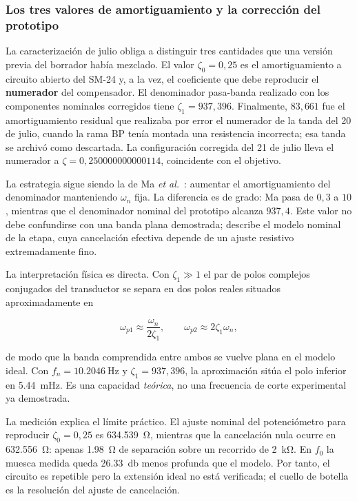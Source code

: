 \subsubsection{Los tres valores de amortiguamiento y la correcci\'on del prototipo}

La caracterizaci\'on de julio obliga a distinguir tres cantidades que una versi\'on previa
del borrador hab\'ia mezclado. El valor $\zeta_0=0{,}25$ es el amortiguamiento a circuito
abierto del SM-24 y, a la vez, el coeficiente que debe reproducir el \textbf{numerador}
del compensador. El denominador pasa-banda realizado con los componentes nominales
corregidos tiene $\zeta_1=937{,}396$. Finalmente, $83{,}661$ fue el amortiguamiento
residual que realizaba por error el numerador de la tanda del 20 de julio, cuando la rama
BP ten\'ia montada una resistencia incorrecta; esa tanda se archiv\'o como descartada. La
configuraci\'on corregida del 21 de julio lleva el numerador a
$\zeta=0{,}250000000000114$, coincidente con el objetivo.

La estrategia sigue siendo la de Ma \emph{et al.}~\cite{Ma2023}: aumentar el
amortiguamiento del denominador manteniendo $\omega_n$ fija. La diferencia es de grado:
Ma pasa de $0{,}3$ a $10$, mientras que el denominador nominal del prototipo alcanza
$937{,}4$. Este valor no debe confundirse con una banda plana demostrada; describe el
modelo nominal de la etapa, cuya cancelaci\'on efectiva depende de un ajuste resistivo
extremadamente fino.

La interpretaci\'on f\'isica es directa. Con $\zeta_1\gg1$ el par de polos complejos
conjugados del transductor se separa en dos polos reales situados aproximadamente en

\begin{equation}
\omega_{p1}\approx\frac{\omega_n}{2\zeta_1},
\qquad
\omega_{p2}\approx 2\zeta_1\omega_n,
\end{equation}

de modo que la banda comprendida entre ambos se vuelve plana en el modelo ideal. Con
$f_n=\SI{10.2046}{\hertz}$ y $\zeta_1=937{,}396$, la aproximaci\'on sit\'ua el polo
inferior en \SI{5.44}{\milli\hertz}. Es una capacidad \emph{te\'orica}, no una frecuencia
de corte experimental ya demostrada.

La medici\'on explica el l\'imite pr\'actico. El ajuste nominal del potenci\'ometro para
reproducir $\zeta_0=0{,}25$ es \SI{634.539}{\ohm}, mientras que la cancelaci\'on nula
ocurre en \SI{632.556}{\ohm}: apenas \SI{1.98}{\ohm} de separaci\'on sobre un recorrido
de \SI{2}{\kilo\ohm}. En $f_0$ la muesca medida queda \SI{26.33}{\decibel} menos profunda
que el modelo. Por tanto, el circuito es repetible pero la extensi\'on ideal no est\'a
verificada; el cuello de botella es la resoluci\'on del ajuste de cancelaci\'on.

